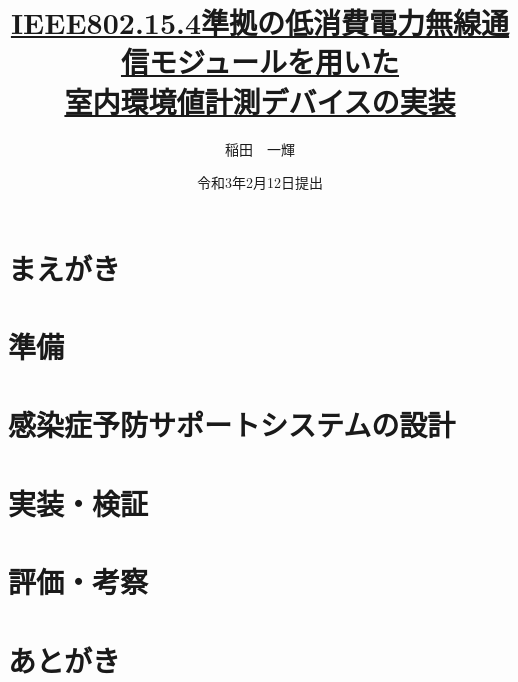 
\newenvironment{indention}[1]{\par
\addtolength{\leftskip}{#1}
\begingroup}{\endgroup\par}

\title{\underline{IEEE802.15.4準拠の低消費電力無線通信モジュールを用いた} \\ \underline{室内環境値計測デバイスの実装}}
\author{稲田　一輝}
\date{令和3年2月12日提出}


\maketitle
\tableofcontents
\cleardoublepage
{}

\chapter{まえがき}


\chapter{準備}


\chapter{感染症予防サポートシステムの設計}






\chapter{実装・検証}




\chapter{評価・考察}




\chapter{あとがき}



